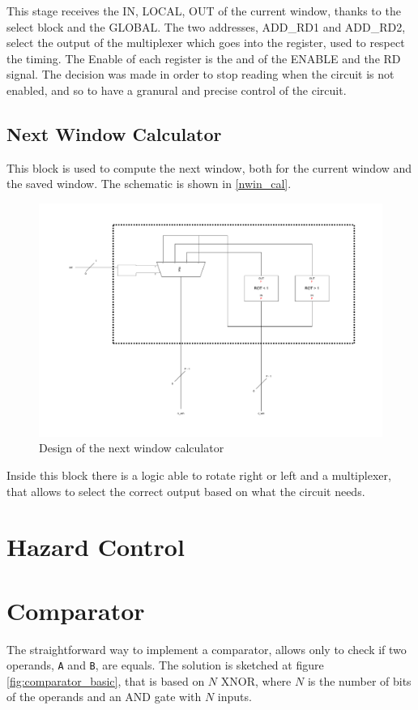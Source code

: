 This stage receives the IN, LOCAL, OUT of the current window, thanks to the select block and the GLOBAL. The two addresses, ADD\_RD1 and ADD\_RD2, select the output of the multiplexer which goes into the register, used to respect the timing. The Enable of each register is the and of the ENABLE and the RD signal. The decision was made in order to stop reading when the circuit is not enabled, and so to have a granural and precise control of the circuit.

\subsection{Next Window Calculator}

This block is used to compute the next window, both for the current window and the saved window. The schematic is shown in \autoref{nwin_cal}.

\begin{figure}[H]
  \centering
  \includegraphics[width=1\textwidth]{chapters/4_DecodeStage/images/nwin_cal.pdf}
  \caption{Design of the next window calculator}
  \label{nwin_cal}
\end{figure}

Inside this block there is a logic able to rotate right or left and a multiplexer, that allows to select the correct output based on what the circuit needs. 

\section{Hazard Control}
\section{Comparator}
\label{sec:comparator}
The straightforward way to implement a comparator, allows only to check if two operands, \texttt{A} and \texttt{B}, are equals. The solution is sketched at figure \ref{fig:comparator_basic}, that is based on $N$ XNOR, where $N$ is the number of bits of the operands and an AND gate with $N$ inputs.

